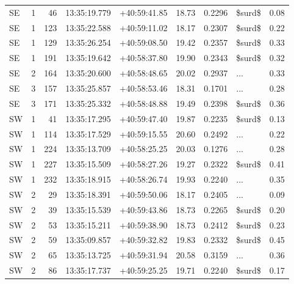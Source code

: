 \begin{tabular}{lrrllrrlr}
  SE &       1 &     46 &  13:35:19.779 &  +40:59:41.85 &  18.73 &    0.2296 &     \$surd\$ &        0.08 \\
  SE &       1 &    123 &  13:35:22.588 &  +40:59:11.02 &  18.17 &    0.2307 &     \$surd\$ &        0.22 \\
  SE &       1 &    129 &  13:35:26.254 &  +40:59:08.50 &  19.42 &    0.2357 &     \$surd\$ &        0.33 \\
  SE &       1 &    191 &  13:35:19.642 &  +40:58:37.80 &  19.90 &    0.2343 &     \$surd\$ &        0.32 \\
  SE &       2 &    164 &  13:35:20.600 &  +40:58:48.65 &  20.02 &    0.2937 &        ... &        0.33 \\
  SE &       3 &    157 &  13:35:25.857 &  +40:58:53.46 &  18.31 &    0.1701 &        ... &        0.28 \\
  SE &       3 &    171 &  13:35:25.332 &  +40:58:48.88 &  19.49 &    0.2398 &     \$surd\$ &        0.36 \\
  SW &       1 &     41 &  13:35:17.295 &  +40:59:47.40 &  19.87 &    0.2235 &     \$surd\$ &        0.13 \\
  SW &       1 &    114 &  13:35:17.529 &  +40:59:15.55 &  20.60 &    0.2492 &        ... &        0.22 \\
  SW &       1 &    224 &  13:35:13.709 &  +40:58:25.25 &  20.03 &    0.1276 &        ... &        0.28 \\
  SW &       1 &    227 &  13:35:15.509 &  +40:58:27.26 &  19.27 &    0.2322 &     \$surd\$ &        0.41 \\
  SW &       1 &    232 &  13:35:18.915 &  +40:58:26.74 &  19.93 &    0.2240 &        ... &        0.35 \\
  SW &       2 &     29 &  13:35:18.391 &  +40:59:50.06 &  18.17 &    0.2405 &        ... &        0.09 \\
  SW &       2 &     39 &  13:35:15.539 &  +40:59:43.86 &  18.73 &    0.2265 &     \$surd\$ &        0.20 \\
  SW &       2 &     53 &  13:35:15.211 &  +40:59:38.90 &  18.73 &    0.2412 &     \$surd\$ &        0.23 \\
  SW &       2 &     59 &  13:35:09.857 &  +40:59:32.82 &  19.83 &    0.2332 &     \$surd\$ &        0.45 \\
  SW &       2 &     65 &  13:35:13.725 &  +40:59:31.94 &  20.58 &    0.3159 &        ... &        0.36 \\
  SW &       2 &     86 &  13:35:17.737 &  +40:59:25.25 &  19.71 &    0.2240 &     \$surd\$ &        0.17 \\

\end{tabular}
